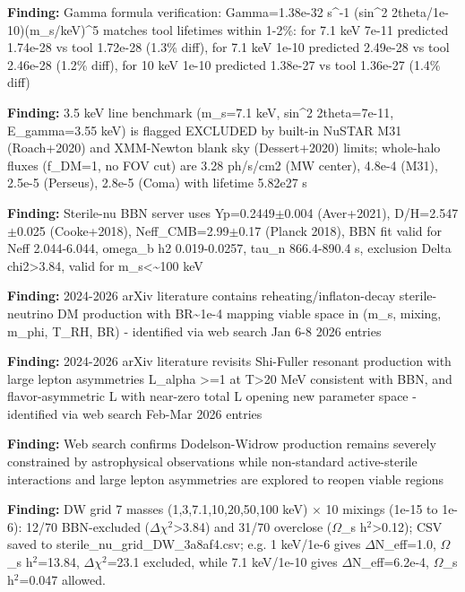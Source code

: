 \documentclass[11pt,a4paper]{article}
\begin{document}
\textbf{Finding:} Gamma formula verification: Gamma=1.38e-32 s\textasciicircum{}-1 (sin\textasciicircum{}2 2theta/1e-10)(m\_s/keV)\textasciicircum{}5 matches tool lifetimes within 1-2\%: for 7.1 keV 7e-11 predicted 1.74e-28 vs tool 1.72e-28 (1.3\% diff), for 7.1 keV 1e-10 predicted 2.49e-28 vs tool 2.46e-28 (1.2\% diff), for 10 keV 1e-10 predicted 1.38e-27 vs tool 1.36e-27 (1.4\% diff)

\textbf{Finding:} 3.5 keV line benchmark (m\_s=7.1 keV, sin\textasciicircum{}2 2theta=7e-11, E\_gamma=3.55 keV) is flagged EXCLUDED by built-in NuSTAR M31 (Roach+2020) and XMM-Newton blank sky (Dessert+2020) limits; whole-halo fluxes (f\_DM=1, no FOV cut) are 3.28 ph/s/cm2 (MW center), 4.8e-4 (M31), 2.5e-5 (Perseus), 2.8e-5 (Coma) with lifetime 5.82e27 s

\textbf{Finding:} Sterile-nu BBN server uses Yp=0.2449$\pm$0.004 (Aver+2021), D/H=2.547$\pm$0.025 (Cooke+2018), Neff\_CMB=2.99$\pm$0.17 (Planck 2018), BBN fit valid for Neff 2.044-6.044, omega\_b h2 0.019-0.0257, tau\_n 866.4-890.4 s, exclusion Delta chi2\textgreater{}3.84, valid for m\_s\textless{}\textasciitilde{}100 keV

\textbf{Finding:} 2024-2026 arXiv literature contains reheating/inflaton-decay sterile-neutrino DM production with BR\textasciitilde{}1e-4 mapping viable space in (m\_s, mixing, m\_phi, T\_RH, BR) - identified via web search Jan 6-8 2026 entries

\textbf{Finding:} 2024-2026 arXiv literature revisits Shi-Fuller resonant production with large lepton asymmetries L\_alpha \textgreater{}=1 at T\textgreater{}20 MeV consistent with BBN, and flavor-asymmetric L with near-zero total L opening new parameter space - identified via web search Feb-Mar 2026 entries

\textbf{Finding:} Web search confirms Dodelson-Widrow production remains severely constrained by astrophysical observations while non-standard active-sterile interactions and large lepton asymmetries are explored to reopen viable regions

\textbf{Finding:} DW grid 7 masses (1,3,7.1,10,20,50,100 keV) $\times$ 10 mixings (1e-15 to 1e-6): 12/70 BBN-excluded ($\Delta$$\chi$$^2$\textgreater{}3.84) and 31/70 overclose ($\Omega$\_s h$^2$\textgreater{}0.12); CSV saved to sterile\_nu\_grid\_DW\_3a8af4.csv; e.g. 1 keV/1e-6 gives $\Delta$N\_eff=1.0, $\Omega$\_s h$^2$=13.84, $\Delta$$\chi$$^2$=23.1 excluded, while 7.1 keV/1e-10 gives $\Delta$N\_eff=6.2e-4, $\Omega$\_s h$^2$=0.047 allowed.
\end{document}
